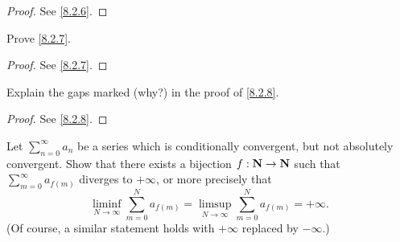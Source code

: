\begin{proof}
  See \cref{8.2.6}.
\end{proof}

\begin{exercise}\label{ex 8.2.4}
  Prove \cref{8.2.7}.
\end{exercise}

\begin{proof}
  See \cref{8.2.7}.
\end{proof}

\begin{exercise}\label{ex 8.2.5}
  Explain the gaps marked (why?) in the proof of \cref{8.2.8}.
\end{exercise}

\begin{proof}
  See \cref{8.2.8}.
\end{proof}

\begin{exercise}\label{ex 8.2.6}
  Let \(\sum_{n = 0}^\infty a_n\) be a series which is conditionally convergent, but not absolutely convergent.
  Show that there exists a bijection \(f : \mathbf{N} \to \mathbf{N}\) such that \(\sum_{m = 0}^\infty a_{f(m)}\) diverges to \(+\infty\), or more precisely that
  \[
    \liminf_{N \to \infty} \sum_{m = 0}^N a_{f(m)} = \limsup_{N \to \infty} \sum_{m = 0}^N a_{f(m)} = +\infty.
  \]
  (Of course, a similar statement holds with \(+\infty\) replaced by \(-\infty\).)
\end{exercise}


